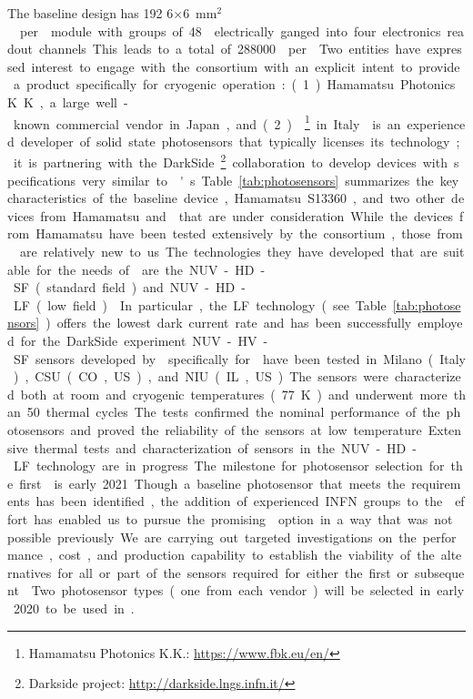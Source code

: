 The baseline  design has \num{192} \num{6}$\times$\SI{6}{mm$^2$}  per  module with groups of \num{48}  electrically ganged into four electronics readout channels. This leads to a total of \num{288000}  per . 

Two entities have expressed interest to engage with the consortium with an explicit intent to provide a product specifically for cryogenic operation: (1) Hamamatsu Photonics K.K., a large well-known commercial vendor in Japan, and (2) \footnote{Hamamatsu Photonics K.K.: \url{https://www.fbk.eu/en/}}
in Italy. 
 is an experienced developer of solid state photosensors that typically licenses its technology; it is partnering with the DarkSide\footnote{Darkside project: \url{http://darkside.lngs.infn.it/}} collaboration to develop devices with specifications very similar to 's.  Table~\ref{tab:photosensors} summarizes the key characteristics of the baseline device, Hamamatsu S13360, and two other devices from Hamamatsu and  that are under consideration.

While the devices from Hamamatsu have been tested extensively by the consortium, those from  are relatively new to us. The technologies they have developed that are suitable for the needs of  are the NUV-HD-SF (standard field) and NUV-HD-LF (low field)~\cite{Gola:2019idb}. In particular, the LF technology (see Table~\ref{tab:photosensors}) offers the lowest dark current rate and has been successfully employed for the DarkSide experiment. NUV-HV-SF sensors developed by  specifically for  have been tested in Milano (Italy), CSU (CO, US), and NIU (IL, US). The sensors were characterized both at room and cryogenic temperatures (\SI{77}{K}) and underwent more than \num{50} thermal cycles. The tests confirmed the nominal performance of the photosensors and proved the reliability of the sensors at low temperature. Extensive thermal tests and characterization of sensors in the NUV-HD-LF technology are in progress.   

The milestone for photosensor selection for the first  is early 2021.  Though a baseline photosensor that meets the requirements has been identified, the addition of experienced INFN groups to the  effort has enabled us to pursue the promising  option in a way that was not possible previously.  We are carrying out targeted investigations on the performance, cost, and production capability to establish the viability of the alternatives for all or part of the sensors required for either the first or subsequent . Two photosensor types (one from each vendor) will be selected in early 2020 to be used in .

